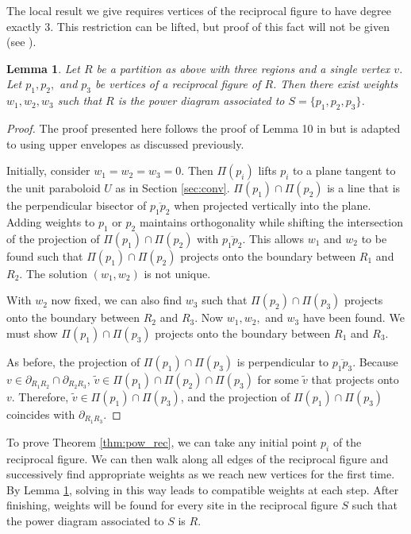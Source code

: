 \documentclass[a4paper, 11pt]{article}
\newtheorem{lemma}{Lemma}[section]
\begin{document}
The local result we give requires vertices of the reciprocal figure to have degree exactly 3. This restriction can be lifted, but proof of this fact
will not be given (see \cite{ash-bolker}).

\begin{lemma}
  Let $R$ be a partition as above with three regions and a single vertex $v$. Let $p_1, p_2,$ and $p_3$ be vertices of a reciprocal figure of $R$. Then there exist weights
  $w_1, w_2, w_3$ such that $R$ is the power diagram associated to $S = \{ p_1, p_2, p_3 \}$.
  \label{lem:rec_loc}
\end{lemma}

\begin{proof}
  The proof presented here follows the proof of Lemma 10 in \cite{ash-bolker} but is adapted to using upper envelopes as discussed previously.

  Initially, consider $w_1 = w_2 = w_3 = 0$. Then $\Pi(p_i)$ lifts $p_i$ to a plane tangent to the unit paraboloid $U$ as in Section \ref{sec:conv}.
  $\Pi(p_1) \cap \Pi(p_2)$ is a line that is the perpendicular bisector of $\overline{p_1 p_2}$ when projected vertically into the plane. Adding weights to $p_1$
  or $p_2$ maintains orthogonality while shifting the intersection of the projection of $\Pi(p_1) \cap \Pi(p_2)$ with $\overline{p_1 p_2}$. This
  allows $w_1$ and $w_2$ to be found such that $\Pi(p_1) \cap \Pi(p_2)$ projects onto the boundary between $R_1$ and $R_2$. The solution $(w_1, w_2)$
  is not unique.

  With $w_2$ now fixed, we can also find $w_3$ such that $\Pi(p_2) \cap \Pi(p_3)$ projects onto the boundary between $R_2$ and $R_3$. Now $w_1, w_2,$
  and $w_3$ have been found. We must show $\Pi(p_1) \cap \Pi(p_3)$ projects onto the boundary between $R_1$ and $R_3$.

  As before, the projection of $\Pi(p_1) \cap \Pi(p_3)$ is perpendicular to $\overline{p_1 p_3}$. Because $v \in \partial_{R_1 R_2} \cap \partial_{R_2
  R_3}$, $\tilde{v} \in \Pi(p_1) \cap \Pi(p_2) \cap \Pi(p_3)$ for some $\tilde{v}$ that projects onto $v$. Therefore, $\tilde{v} \in \Pi(p_1) \cap
  \Pi(p_3)$, and the projection of $\Pi(p_1) \cap \Pi(p_3)$ coincides with $\partial_{R_1 R_3}$.
\end{proof}

To prove Theorem \ref{thm:pow_rec}, we can take any initial point $p_i$ of the reciprocal figure. We can then walk along all edges of the reciprocal
figure and successively find appropriate weights as we reach new vertices for the first time. By Lemma \ref{lem:rec_loc}, solving in this way leads to
compatible weights at each step. After finishing, weights will be found for every site in the reciprocal figure $S$ such that the power diagram
associated to $S$ is $R$.
\end{document}
